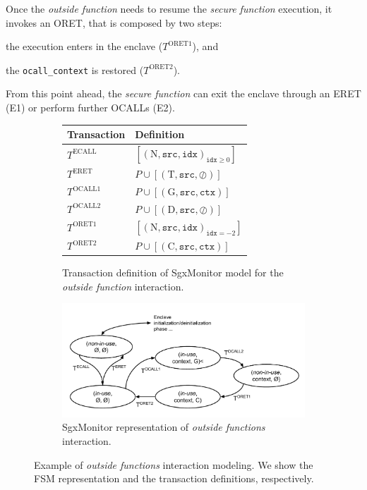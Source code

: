 Once the \emph{outside function} needs to resume the \emph{secure function} 
execution, it invokes an ORET, that is composed by two steps: 
\begin{enumerate*}[label=(\roman*)]
	\item the execution enters in the enclave (\ie $T^\text{ORET1}$), and
	\item the \texttt{ocall\_context} is restored (\ie $T^\text{ORET2}$).
\end{enumerate*}
From this point ahead, the \emph{secure function} can exit the enclave
through an ERET (E1) or perform further OCALLs (E2).

\begin{figure}[t]
	\centering
	\begin{subfigure}[b]{0.43\textwidth}
		\centering
		\begin{tabular}{ll}
			\toprule 
			\textbf{Transaction} & \textbf{Definition} \\ \midrule
			$T^\text{ECALL}$ & $[(\text{N}, \texttt{src}, 
			\texttt{idx})_{\texttt{idx} \geq 0}]$ \\ 
			$T^\text{ERET}$ & $P \cup [(\text{T},\texttt{src},\oslash)]$ \\
			$T^\text{OCALL1}$ & $P \cup [(\text{G}, \texttt{src}, 
			\texttt{ctx})]$ \\ 
			$T^\text{OCALL2}$ & $P \cup [(\text{D},\texttt{src},\oslash)]$ 
			\\ 
			$T^\text{ORET1}$ & $[(\text{N}, \texttt{src}, 
			\texttt{idx})_{\texttt{idx} = -2}]$ \\
			$T^\text{ORET2}$ & $P \cup [(\text{C}, \texttt{src}, 
			\texttt{ctx})]$ \\
			\bottomrule
		\end{tabular} 
		\caption{Transaction definition of SgxMonitor model for the 
		\emph{outside function} interaction.}
		\label{tbl:transactions}
    \end{subfigure}
	\hfill
	\begin{subfigure}[b]{0.56\textwidth}
		\centering
		\includegraphics[width=\linewidth]{fig_c6/my-model.pdf}
		\caption{SgxMonitor representation of \emph{outside functions} 
		interaction.}
		\label{fig:my-model}
	\end{subfigure}
	\caption[SGX \emph{outside functions} interaction modeling.]{Example of 
	\emph{outside functions} interaction modeling.
	We show the FSM representation and the transaction definitions, 
	respectively.}
	\label{fig:outside-function}
\end{figure}
